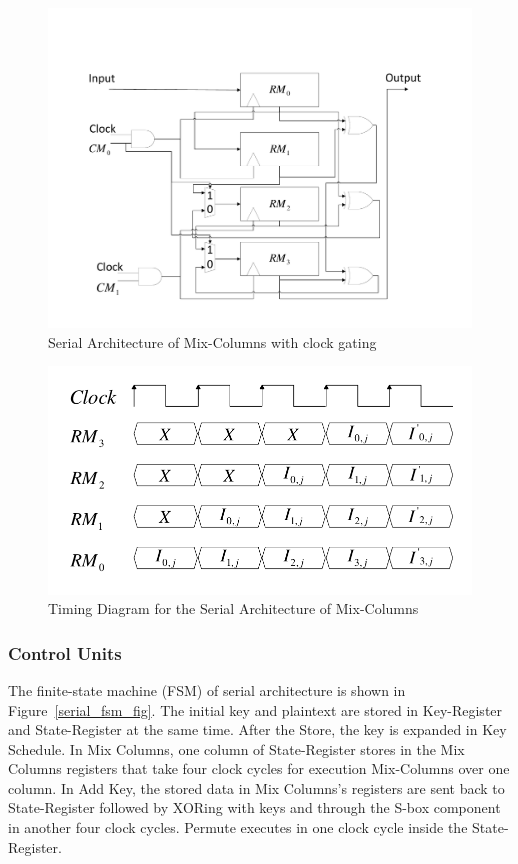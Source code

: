 \documentclass[sn-basic]{sn-jnl}%
\begin{document}
\begin{figure}[h]%
    \centering
    \includegraphics[width=\textwidth]{Mix-Columns.pdf}
    \caption{Serial Architecture of Mix-Columns with clock gating}\label{serial_mix_columns_fig}
\end{figure}

\begin{figure}[h]%
    \centering
    \includegraphics[width=\textwidth]{Mix-Columns-Times.pdf}
    \caption{Timing Diagram for the Serial Architecture of Mix-Columns }\label{serial_time_diagrm_mix_colunms}
\end{figure}

\subsubsection{Control Units}\label{subsubsec3}

The finite-state machine (FSM) of serial architecture is shown in Figure~\ref{serial_fsm_fig}.
The initial key and plaintext are stored in Key-Register and State-Register at the same time. After the Store, the key is expanded in Key Schedule.
In Mix Columns, one column of State-Register stores in the Mix Columns registers that take four clock cycles for execution Mix-Columns over one column.
In Add Key, the stored data in Mix Columns's registers are sent back to State-Register followed by XORing with keys and through the S-box component in another four clock cycles.
Permute executes in one clock cycle inside the State-Register.
\end{document}
